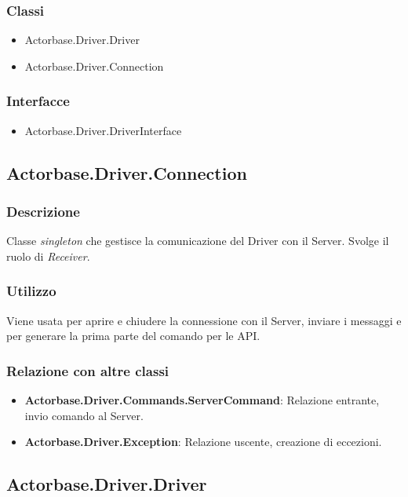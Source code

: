 \documentclass[a4paper]{article}
\begin{document}
		\subsubsection{Classi}
			\begin{itemize}
				\item Actorbase.Driver.Driver
				\item Actorbase.Driver.Connection
			\end{itemize}
			
		\subsubsection{Interfacce}
			\begin{itemize}
				\item Actorbase.Driver.DriverInterface
			\end{itemize}
		
		\subsection{Actorbase.Driver.Connection}
		
		\subsubsection{Descrizione}
			Classe \emph{singleton} che gestisce la comunicazione del Driver con il Server. Svolge il ruolo di \emph{Receiver}.
		\subsubsection{Utilizzo}
			Viene usata per aprire e chiudere la connessione con il Server, inviare i messaggi e per generare la prima parte del comando per le API.
		\subsubsection{Relazione con altre classi}
			\begin{itemize}
				\item \textbf{Actorbase.Driver.Commands.ServerCommand}: Relazione entrante, invio comando al Server.
				\item \textbf{Actorbase.Driver.Exception}: Relazione uscente, creazione di eccezioni.
			\end{itemize}
		
		\subsection{Actorbase.Driver.Driver}
		
\end{document}
